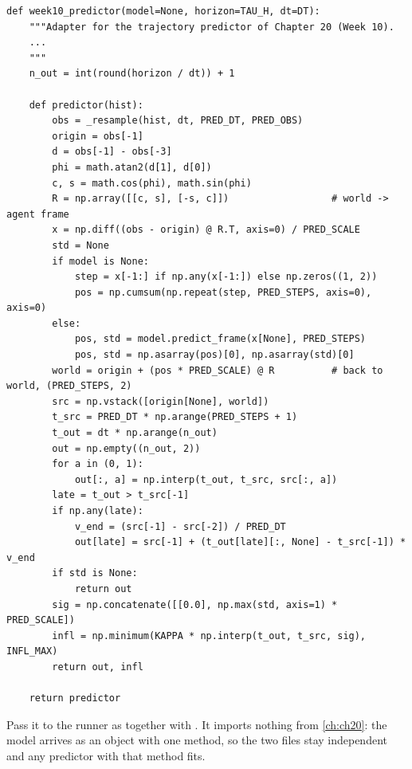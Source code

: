 \begin{lstlisting}[caption={The Week-10 adapter (from \code{code/ch25\_evaluation.py}; the docstring is abridged at the ellipsis). \code{model} is the reader's trained predictor of \cref{ch:ch20}; with \code{model=None} the same code is the constant-velocity stand-in.},label={lst:ch25-week10}]
def week10_predictor(model=None, horizon=TAU_H, dt=DT):
    """Adapter for the trajectory predictor of Chapter 20 (Week 10).
    ...
    """
    n_out = int(round(horizon / dt)) + 1

    def predictor(hist):
        obs = _resample(hist, dt, PRED_DT, PRED_OBS)
        origin = obs[-1]
        d = obs[-1] - obs[-3]
        phi = math.atan2(d[1], d[0])
        c, s = math.cos(phi), math.sin(phi)
        R = np.array([[c, s], [-s, c]])                  # world -> agent frame
        x = np.diff((obs - origin) @ R.T, axis=0) / PRED_SCALE
        std = None
        if model is None:
            step = x[-1:] if np.any(x[-1:]) else np.zeros((1, 2))
            pos = np.cumsum(np.repeat(step, PRED_STEPS, axis=0), axis=0)
        else:
            pos, std = model.predict_frame(x[None], PRED_STEPS)
            pos, std = np.asarray(pos)[0], np.asarray(std)[0]
        world = origin + (pos * PRED_SCALE) @ R          # back to world, (PRED_STEPS, 2)
        src = np.vstack([origin[None], world])
        t_src = PRED_DT * np.arange(PRED_STEPS + 1)
        t_out = dt * np.arange(n_out)
        out = np.empty((n_out, 2))
        for a in (0, 1):
            out[:, a] = np.interp(t_out, t_src, src[:, a])
        late = t_out > t_src[-1]
        if np.any(late):
            v_end = (src[-1] - src[-2]) / PRED_DT
            out[late] = src[-1] + (t_out[late][:, None] - t_src[-1]) * v_end
        if std is None:
            return out
        sig = np.concatenate([[0.0], np.max(std, axis=1) * PRED_SCALE])
        infl = np.minimum(KAPPA * np.interp(t_out, t_src, sig), INFL_MAX)
        return out, infl

    return predictor
\end{lstlisting}

Pass it to the runner as  together with
 . It imports
nothing from \cref{ch:ch20}: the model arrives as an object with one method,
so the two files stay independent and any predictor with that method fits.

